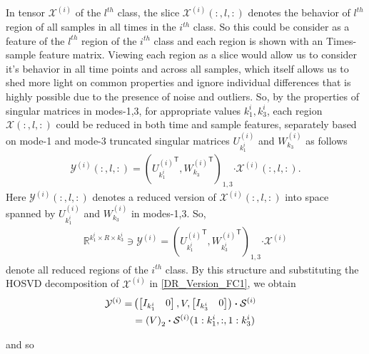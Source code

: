 \documentclass[journal]{IEEEtran}
\newcommand{\trans}{\mathsf{T}}
\begin{document}
	In tensor  $\mathcal{X}^{(i)}$ of the $l^{th}$ class, the slice $\mathcal{X}^{(i)}(:,l,:)$ denotes
	the  behavior of $l^{th}$  region of all samples in all times in the $i^{th}$ class. So this could be consider as a feature of the $l^{th}$ region  of the $i^{th}$ class and each region is shown with an Times-sample feature matrix. Viewing each region as a slice would allow us to consider it's behavior in all time points and across all samples, which itself allows us to shed more light on common properties and ignore individual differences that is highly possible due to the presence of noise and outliers.
	So, by the properties of singular matrices in modes-1,3, for appropriate values
	$k_1^i,k_3^i$, each region $\mathcal{X}(:,l,:)$ could be reduced in both time and sample features, separately
	based on mode-1 and mode-3 truncated singular matrices $U_{k_1^i}^{(i)}$ and $W_{k_3}^{(i)}$
	as follows
	\begin{eqnarray}
	\mathcal{Y}^{(i)}(:,l,:) = \left( 
	{U_{k_1^i}^{(i)}}^{\trans},  {W_{k_3}^{(i)}}^{\trans} 
	\right)_{1,3} \boldsymbol{\cdot} \mathcal{X}^{(i)}(:,l,:).
	\end{eqnarray}
	Here $\mathcal{Y}^{(i)}(:,l,:)$  denotes a reduced version of $\mathcal{X}^{(i)}(:,l,:)$ into space
	spanned by $U_{k_1^i}^{(i)}$ and $W_{k_3}^{(i)}$ in modes-1,3. So,
	\begin{align}
	\mathbb{R}^{k_1^i \times R \times k_3^i} \ni  {{\mathcal{Y}^{(i)}}} = \left( 
	{U_{k_1^i}^{(i)}}^{\trans}, {W_{k^i_3}^{(i)}}^{\trans} 
	\right)_{1,3}\boldsymbol{\cdot} \mathcal{X}^{(i)} \label{DR_Version_FC1}
	\end{align} 
	denote all reduced regions of the $i^{th}$ class. By this structure  and substituting the HOSVD decomposition of $\mathcal{X}^{(i)}$ in \eqref{DR_Version_FC1},  we obtain
	\begin{align}
	{\mathcal{Y}}^{(i)}= & \notag
	\left(
	\begin{bmatrix}
	I_{k_1^i} &  0
	\end{bmatrix},
	V,
	\begin{bmatrix}
	I_{k_3^i} &  0
	\end{bmatrix}
	\right)\boldsymbol{\cdot} \mathcal{S}^{(i)} \notag
	\\&=\left( 
	V
	\right)_{2} \boldsymbol{\cdot} \mathcal{S}^{(i)}(1:k_1^i,:, 1:k_3^i) \notag &
	\end{align}
	
	and so
	
\end{document}
